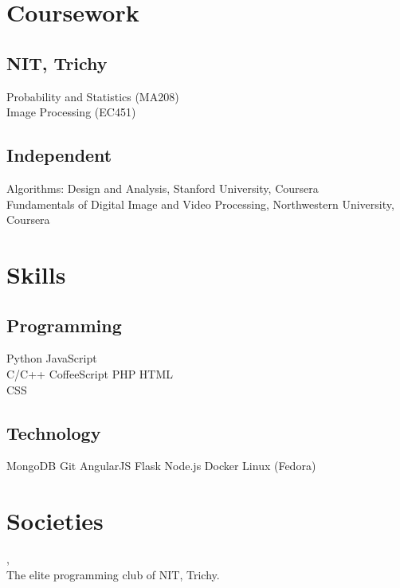 \documentclass[]{deedy-resume-openfont}
\begin{document}
\begin{minipage}[t]{0.33\textwidth}
\section{Coursework} 
\subsection{NIT, Trichy}
Probability and Statistics (MA208)\\
Image Processing (EC451)
\sectionsep
\subsection{Independent}
Algorithms: Design and Analysis, Stanford University, Coursera\\
Fundamentals of Digital Image and Video Processing, Northwestern University, Coursera \\
\sectionsep


\section{Skills}
\subsection{Programming}
Python \textbullet{} JavaScript \\
\textbullet{} C/C++ \textbullet{} CoffeeScript \textbullet{} PHP \textbullet{} HTML \\ \textbullet{}  CSS
\subsection{Technology}
\textbullet{} MongoDB \textbullet{} Git \textbullet{} AngularJS \textbullet{} Flask \textbullet{} Node.js \textbullet{} Docker \textbullet{} Linux (Fedora)
\sectionsep

\section{Societies} 
{\href{https://github.com/delta}{}},\\ The elite programming club of NIT, Trichy.
\sectionsep


%
%

\end{minipage} 
\end{document}
